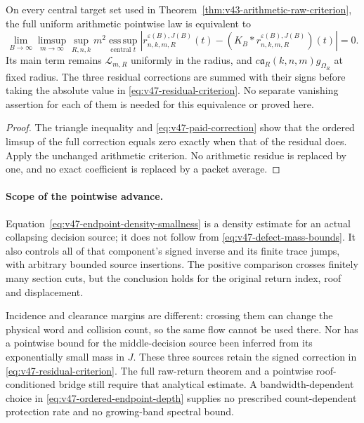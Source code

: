 \begin{corollary}
\label{cor:v47-arithmetic-residual}
On every central target set used in
Theorem~\ref{thm:v43-arithmetic-raw-criterion}, the full uniform
arithmetic pointwise law is equivalent to
\begin{equation}\label{eq:v47-residual-criterion}
 \lim_{B\to\infty}\limsup_{m\to\infty}\sup_{R,n,k}
 m^2\operatorname*{ess\,sup}_{\text{central }t}
 \left|r^{\varepsilon(B),J(B)}_{n,k,m,R}(t)
              -(K_B*r^{\varepsilon(B),J(B)}_{n,k,m,R})(t)\right|=0.
\end{equation}
Its main term remains $\mathcal L_{m,R}$ uniformly in the radius,
and $c\mathfrak a_R(k,n,m)g_{\Omega_R}$ at fixed radius.
The three residual corrections are summed with their signs before
taking the absolute value in \eqref{eq:v47-residual-criterion}.
No separate vanishing assertion for each of them is needed for this
equivalence or proved here.
\end{corollary}
\begin{proof}
The triangle inequality and \eqref{eq:v47-paid-correction} show that
the ordered limsup of the full correction equals zero exactly when
that of the residual does. Apply the unchanged arithmetic criterion.
No arithmetic residue is replaced by one, and no exact coefficient
is replaced by a packet average.
\end{proof}

\paragraph{Scope of the pointwise advance.}
Equation~\eqref{eq:v47-endpoint-density-smallness} is a density
estimate for an actual collapsing decision source; it does not follow
from \eqref{eq:v47-defect-mass-bounds}. It also controls all of that
component's signed inverse and its finite trace jumps, with arbitrary
bounded source insertions. The positive comparison crosses finitely
many section cuts, but the conclusion holds for the original return
index, roof and displacement.

Incidence and clearance margins are different: crossing them can
change the physical word and collision count, so the same flow cannot
be used there. Nor has a pointwise bound for the middle-decision source
been inferred from its exponentially small mass in $J$. These three
sources retain the signed correction in
\eqref{eq:v47-residual-criterion}. The full raw-return theorem and a
pointwise roof-conditioned bridge still require that analytical
estimate. A bandwidth-dependent choice in
\eqref{eq:v47-ordered-endpoint-depth} supplies no prescribed
count-dependent protection rate and no growing-band spectral bound.
